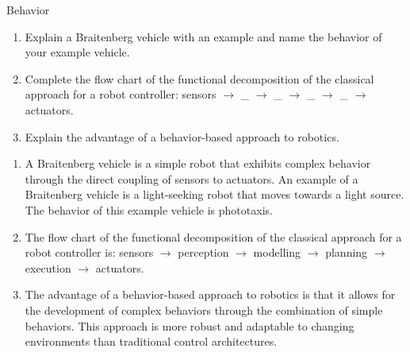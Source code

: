 \documentclass{article}
\begin{document}
\begin{exercise}{Behavior}
  \begin{enumerate}
    \item Explain a Braitenberg vehicle with an example and name the behavior of your example vehicle.
    \item Complete the flow chart of the functional decomposition of the classical approach for a robot controller: sensors $\rightarrow$ \_ $\rightarrow$ \_ $\rightarrow$ \_ $\rightarrow$ \_ $\rightarrow$ actuators.
    \item Explain the advantage of a behavior-based approach to robotics.
  \end{enumerate}

  \begin{solution}
    \begin{enumerate}
      \item A Braitenberg vehicle is a simple robot that exhibits complex behavior through the direct coupling of sensors to actuators. An example of a Braitenberg vehicle is a light-seeking robot that moves towards a light source. The behavior of this example vehicle is phototaxis.
      \item The flow chart of the functional decomposition of the classical approach for a robot controller is: sensors $\rightarrow$ perception $\rightarrow$ modelling $\rightarrow$ planning $\rightarrow$ execution $\rightarrow$ actuators.
      \item The advantage of a behavior-based approach to robotics is that it allows for the development of complex behaviors through the combination of simple behaviors. This approach is more robust and adaptable to changing environments than traditional control architectures.
    \end{enumerate}
  \end{solution}
\end{exercise}
\end{document}
